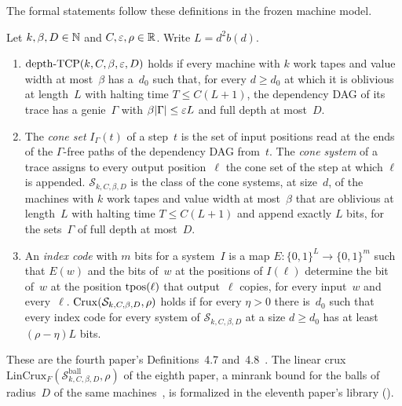 The formal statements follow these definitions in the frozen machine model.

\begin{definition}\label{def:crux}
Let $k,\beta,D\in\mathbb{N}$ and $C,\varepsilon,\rho\in\mathbb{R}$. Write $L=d^2b(d)$.
\begin{enumerate}[label=(\alph*)]
\item $\mathrm{depth}\text{-}\mathrm{TCP}(k,C,\beta,\varepsilon,D)$ holds if every machine with $k$ work tapes and value width at most~$\beta$
has a~$d_0$ such that, for every $d\ge d_0$ at which it is oblivious at length~$L$ with halting time $T\le C(L+1)$, the
dependency DAG of its trace has a genie~$\Gamma$ with $\beta\lvert \Gamma \rvert\le\varepsilon L$ and full depth at most~$D$.
\item The \emph{cone set} $I_\Gamma(t)$ of a step~$t$ is the set of input positions read at the ends of the $\Gamma$-free paths of
the dependency DAG from~$t$. The \emph{cone system} of a trace assigns to every output position~$\ell$ the cone set of the step at
which $\ell$ is appended. $\mathcal S_{k,C,\beta,D}$ is the class of the cone systems, at size~$d$, of the machines with $k$ work
tapes and value width at most~$\beta$ that are oblivious at length~$L$ with halting time $T\le C(L+1)$ and append exactly $L$
bits, for the sets~$\Gamma$ of full depth at most~$D$.
\item An \emph{index code} with $m$ bits for a system~$I$ is a map $E\colon\{0,1\}^L\to\{0,1\}^m$ such that $E(w)$ and the bits
of~$w$ at the positions of $I(\ell)$ determine the bit of~$w$ at the position $\operatorname{tpos}(\ell)$ that output~$\ell$ copies, for every
input~$w$ and every~$\ell$. $\mathrm{Crux}(\mathcal S_{k,C,\beta,D},\rho)$ holds if for every $\eta>0$ there is~$d_0$ such that every
index code for every system of $\mathcal S_{k,C,\beta,D}$ at a size $d\ge d_0$ has at least $(\rho-\eta)L$ bits.
\end{enumerate}
\end{definition}

These are the fourth paper's Definitions~4.7 and~4.8~\cite{FourthPaper2026}. The linear crux
$\mathrm{LinCrux}_F(\mathcal S^{\mathrm{ball}}_{k,C,\beta,D},\rho)$ of the eighth paper, a minrank bound for the balls of
radius~$D$ of the same machines~\cite[Definition~7.4]{EighthPaper2026}, is formalized in the eleventh paper's library
().

